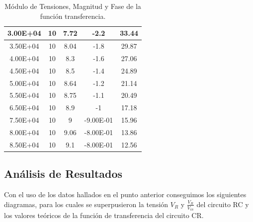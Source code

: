 \begin{table}[!htb]
\begin{tabular}{|c|c|c|c|c|}
3.00E+04  & 10    & 7.72     & -2.2            & 33.44         \\ \hline
3.50E+04  & 10    & 8.04     & -1.8            & 29.87         \\ \hline
4.00E+04  & 10    & 8.3      & -1.6            & 27.06         \\ \hline
4.50E+04  & 10    & 8.5      & -1.4            & 24.89         \\ \hline
5.00E+04  & 10    & 8.64     & -1.2            & 21.14         \\ \hline
5.50E+04  & 10    & 8.75     & -1.1            & 20.49         \\ \hline
6.50E+04  & 10    & 8.9      & -1              & 17.18         \\ \hline
7.50E+04  & 10    & 9        & -9.00E-01       & 15.96         \\ \hline
8.00E+04  & 10    & 9.06     & -8.00E-01       & 13.86         \\ \hline
8.50E+04  & 10    & 9.1      & -8.00E-01       & 12.56         \\ \hline
\end{tabular}
\caption{Módulo de Tensiones, Magnitud y Fase de la función transferencia.}
\end{table}

\clearpage
\subsection{Análisis de Resultados}

Con el uso de los datos hallados en el punto anterior conseguimos los siguientes diagramas, para los cuales se superpusieron la tensión $V_R$ y $\frac{V_R}{V_{in}}$ del circuito RC y los valores teóricos de la función de transferencia del circuito CR. 

